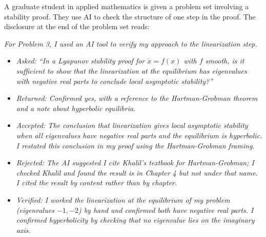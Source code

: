 \documentclass[11pt]{book}
\begin{document}
\begin{example}
A graduate student in applied mathematics is given a problem set involving a stability proof. They use AI to check the structure of one step in the proof. The disclosure at the end of the problem set reads:

\medskip
\noindent \emph{For Problem 3, I used an AI tool to verify my approach to the linearization step.}
\begin{itemize}\setlength{\itemsep}{1pt}
\item[1.] \emph{Asked: ``In a Lyapunov stability proof for $\dot{x} = f(x)$ with $f$ smooth, is it sufficient to show that the linearization at the equilibrium has eigenvalues with negative real parts to conclude local asymptotic stability?''}
\item[2.] \emph{Returned: Confirmed yes, with a reference to the Hartman-Grobman theorem and a note about hyperbolic equilibria.}
\item[3.] \emph{Accepted: The conclusion that linearization gives local asymptotic stability when all eigenvalues have negative real parts and the equilibrium is hyperbolic. I restated this conclusion in my proof using the Hartman-Grobman framing.}
\item[4.] \emph{Rejected: The AI suggested I cite Khalil's textbook for Hartman-Grobman; I checked Khalil and found the result is in Chapter 4 but not under that name. I cited the result by content rather than by chapter.}
\item[5.] \emph{Verified: I worked the linearization at the equilibrium of my problem (eigenvalues $-1, -2$) by hand and confirmed both have negative real parts. I confirmed hyperbolicity by checking that no eigenvalue lies on the imaginary axis.}
\end{itemize}
\end{example}
\end{document}
